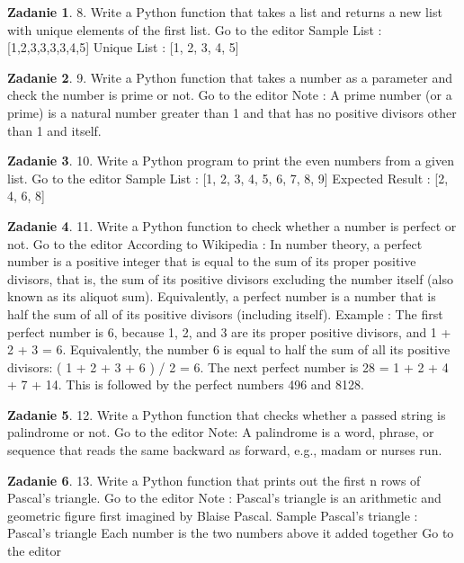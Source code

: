 \documentclass[11pt]{article}
\theoremstyle{definition}
\newtheorem{zadanie}{Zadanie}
\begin{document}
\begin{zadanie}
8. Write a Python function that takes a list and returns a new list with unique elements of the first list. Go to the editor
Sample List : [1,2,3,3,3,3,4,5]
Unique List : [1, 2, 3, 4, 5]
\end{zadanie}

\begin{zadanie}
9. Write a Python function that takes a number as a parameter and check the number is prime or not. Go to the editor
Note : A prime number (or a prime) is a natural number greater than 1 and that has no positive divisors other than 1 and itself.
\end{zadanie}

\begin{zadanie}
10. Write a Python program to print the even numbers from a given list. Go to the editor
Sample List : [1, 2, 3, 4, 5, 6, 7, 8, 9]
Expected Result : [2, 4, 6, 8]
\end{zadanie}

\begin{zadanie}
11. Write a Python function to check whether a number is perfect or not. Go to the editor
According to Wikipedia : In number theory, a perfect number is a positive integer that is equal to the sum of its proper positive divisors, that is, the sum of its positive divisors excluding the number itself (also known as its aliquot sum). Equivalently, a perfect number is a number that is half the sum of all of its positive divisors (including itself).
Example : The first perfect number is 6, because 1, 2, and 3 are its proper positive divisors, and 1 + 2 + 3 = 6. Equivalently, the number 6 is equal to half the sum of all its positive divisors: ( 1 + 2 + 3 + 6 ) / 2 = 6. The next perfect number is 28 = 1 + 2 + 4 + 7 + 14. This is followed by the perfect numbers 496 and 8128.
\end{zadanie}

\begin{zadanie}
12. Write a Python function that checks whether a passed string is palindrome or not. Go to the editor
Note: A palindrome is a word, phrase, or sequence that reads the same backward as forward, e.g., madam or nurses run.
\end{zadanie}

\begin{zadanie}
13. Write a Python function that prints out the first n rows of Pascal's triangle. Go to the editor
Note : Pascal's triangle is an arithmetic and geometric figure first imagined by Blaise Pascal.
Sample Pascal's triangle :
Pascal's triangle
Each number is the two numbers above it added together Go to the editor
\end{zadanie}
\end{document}

